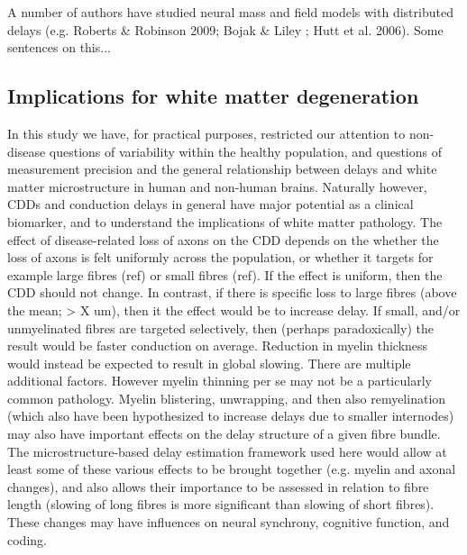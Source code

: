 A number of authors have studied neural mass and field models with distributed delays (e.g. Roberts \& Robinson 2009; Bojak \& Liley \cite{bojak2010axonal}; Hutt et al. 2006). Some sentences on this...



% 


\subsection{Implications for white matter degeneration}

In this study we have, for practical purposes, restricted our attention to non-disease questions of variability within the healthy population, and questions of measurement precision and the general relationship between delays and white matter microstructure in human and non-human brains. Naturally however, CDDs and conduction delays in general have major potential as a clinical biomarker, and to understand the implications of white matter pathology. The effect of disease-related loss of axons on the CDD depends on the whether the loss of axons is felt uniformly across the population, or whether it targets for example large fibres (ref) or small fibres (ref). If the effect is uniform, then the CDD should not change. In contrast, if there is specific loss to large fibres (above the mean; > X um), then it the effect would be to increase delay. If small, and/or unmyelinated fibres are targeted selectively, then (perhaps paradoxically) the result would be faster conduction on average. Reduction in myelin thickness would instead be expected to result in global slowing. There are multiple additional factors. However myelin thinning per se may not be a particularly common pathology. Myelin blistering, unwrapping, and then also remyelination (which also have been hypothesized to increase delays due to smaller internodes) may also have important effects on the delay structure of a given fibre bundle. The microstructure-based delay estimation framework used here would allow at least some of these various effects to be brought together (e.g. myelin and axonal changes), and also allows their importance to be assessed in relation to fibre length (slowing of long fibres is more significant than slowing of short fibres).  These changes may have influences on  neural synchrony, cognitive function, and coding.




